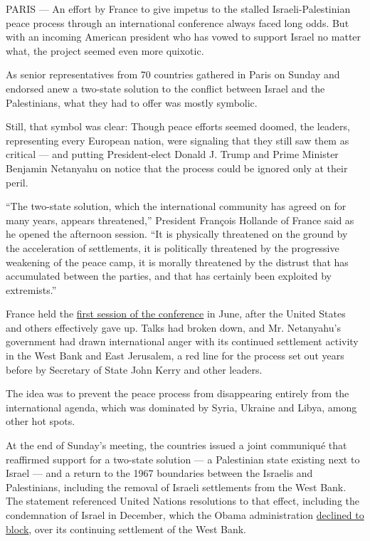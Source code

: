 PARIS --- An effort by France to give impetus to the stalled
Israeli-Palestinian peace process through an international conference
always faced long odds. But with an incoming American president who has
vowed to support Israel no matter what, the project seemed even more
quixotic.

As senior representatives from 70 countries gathered in Paris on Sunday
and endorsed anew a two-state solution to the conflict between Israel
and the Palestinians, what they had to offer was mostly symbolic.

Still, that symbol was clear: Though peace efforts seemed doomed, the
leaders, representing every European nation, were signaling that they
still saw them as critical --- and putting President-elect Donald J.
Trump and Prime Minister Benjamin Netanyahu on notice that the process
could be ignored only at their peril.

``The two-state solution, which the international community has agreed
on for many years, appears threatened,'' President François Hollande of
France said as he opened the afternoon session. ``It is physically
threatened on the ground by the acceleration of settlements, it is
politically threatened by the progressive weakening of the peace camp,
it is morally threatened by the distrust that has accumulated between
the parties, and that has certainly been exploited by extremists.''

France held the
\href{https://www.nytimes3xbfgragh.onion/2016/06/04/world/europe/france-hosts-talks-on-restarting-mideast-peace-process.html}{first
session of the conference} in June, after the United States and others
effectively gave up. Talks had broken down, and Mr. Netanyahu's
government had drawn international anger with its continued settlement
activity in the West Bank and East Jerusalem, a red line for the process
set out years before by Secretary of State John Kerry and other leaders.

The idea was to prevent the peace process from disappearing entirely
from the international agenda, which was dominated by Syria, Ukraine and
Libya, among other hot spots.

At the end of Sunday's meeting, the countries issued a joint communiqué
that reaffirmed support for a two-state solution --- a Palestinian state
existing next to Israel --- and a return to the 1967 boundaries between
the Israelis and Palestinians, including the removal of Israeli
settlements from the West Bank. The statement referenced United Nations
resolutions to that effect, including the condemnation of Israel in
December, which the Obama administration
\href{https://www.nytimes3xbfgragh.onion/2016/12/23/world/middleeast/israel-settlements-un-vote.html}{declined
to block}, over its continuing settlement of the West Bank.

